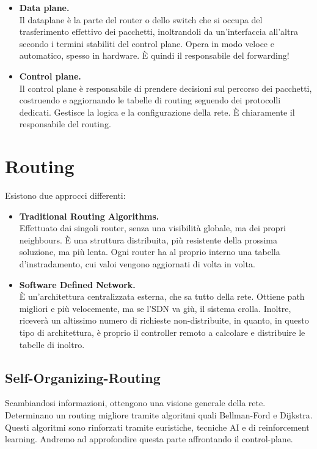 \begin{itemize}
	\item \textbf{Data plane.}\\
	Il dataplane è la parte del router o dello switch che si occupa del trasferimento effettivo dei pacchetti, inoltrandoli da un’interfaccia all’altra secondo i termini stabiliti del control plane. Opera in modo veloce e automatico, spesso in hardware. È quindi il responsabile del forwarding!
	
	\item \textbf{Control plane.}\\
	Il control plane è responsabile di prendere decisioni sul percorso dei pacchetti, costruendo e aggiornando le tabelle di routing seguendo dei protocolli dedicati. Gestisce la logica e la configurazione della rete. È chiaramente il responsabile del routing.
\end{itemize}

\newpage

\section{Routing}

Esistono due approcci differenti:
\begin{itemize}
	\item \textbf{Traditional Routing Algorithms.}\\
	Effettuato dai singoli router, senza una visibilità globale, ma dei propri neighbours. È una struttura distribuita, più resistente della prossima soluzione, ma più lenta. Ogni router ha al proprio interno una tabella d'instradamento, cui valoi vengono aggiornati di volta in volta.
	\item \textbf{Software Defined Network.}\\
	È un'architettura centralizzata esterna, che sa tutto della rete. Ottiene path migliori e più velocemente, ma se l'SDN va giù, il sistema crolla. Inoltre, riceverà un altissimo numero di richieste non-distribuite, in quanto, in questo tipo di architettura, è proprio il controller remoto a calcolare e distribuire le tabelle di inoltro.
	
\end{itemize}
\subsection{Self-Organizing-Routing}
Scambiandosi informazioni, ottengono una visione generale della rete. Determinano un routing migliore tramite algoritmi quali Bellman-Ford e Dijkstra. Questi algoritmi sono rinforzati tramite euristiche, tecniche AI e di reinforcement learning. Andremo ad approfondire questa parte affrontando il control-plane. 

